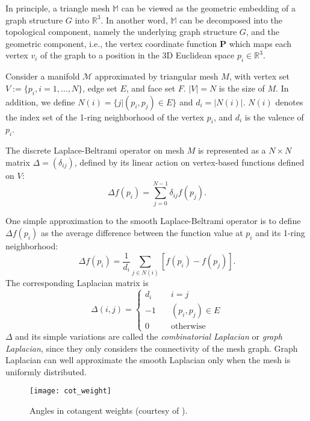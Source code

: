 In principle, a triangle mesh $\mathbb{M}$ can be viewed as the geometric
embedding of a graph structure $G$ into $\mathbb{R}^3$. In another word,
$\mathbb{M}$ can be decomposed into the topological component, namely the
underlying graph structure $G$, and the geometric component, i.e., the
vertex coordinate function $\mathbf{P}$ which maps each vertex $v_i$ of
the graph to a position in the 3D Euclidean space $p_i\in\mathbb{R}^3$.

Consider a manifold $\mathcal{M}$ approximated by triangular mesh $M$, with vertex
set $V:=\{p_i, i=1,\ldots,N\}$, edge set $E$, and face set $F$. $|V|=N$ is the size
of $M$. In addition, we define $N(i)=\{j|(p_i,p_j)\in E\}$ and $d_i=|N(i)|$. $N(i)$
denotes the index set of the 1-ring neighborhood of the vertex $p_i$, and $d_i$ is
the valence of $p_i$.

The discrete Laplace-Beltrami operator on mesh $M$ is represented as a
$N\times N$ matrix $\Delta=(\delta_{ij})$, defined by its linear action
on vertex-based functions defined on $V$:
\begin{equation}
\Delta f(p_i)=\sum_{j=0}^{N-1}\delta_{ij}f(p_j).
\end{equation}

One simple approximation to the smooth Laplace-Beltrami operator is to
define $\Delta f(p_i)$ as the average difference between the function
value at $p_i$ and its 1-ring neighborhood:
\begin{equation}
\Delta f(p_i)=\frac{1}{d_i}\sum_{j\in N(i)} [f(p_i)-f(p_j)].
\end{equation}
The corresponding Laplacian matrix is
\begin{equation}
\Delta(i,j)=\left\{
    \begin{array}{lc}
    d_i\quad & i=j \\
    -1\quad & (p_i,p_j)\in E \\
    0\quad & \text{otherwise}
    \end{array}
\right.
\end{equation}
$\Delta$ and its simple variations are called the \emph{combinatorial Laplacian}
or \emph{graph Laplacian}, since they only considers the connectivity of the mesh
graph. Graph Laplacian can well approximate the smooth Laplacian only when the mesh
is uniformly distributed.

\begin{figure}
  \centering
  \texttt{[image: cot\_weight]}
  \caption[Angles in cotangent weights]{Angles in cotangent weights (courtesy of \cite{Sorkine:EG:2005}).}
\label{fig:cotweights}
\end{figure}

